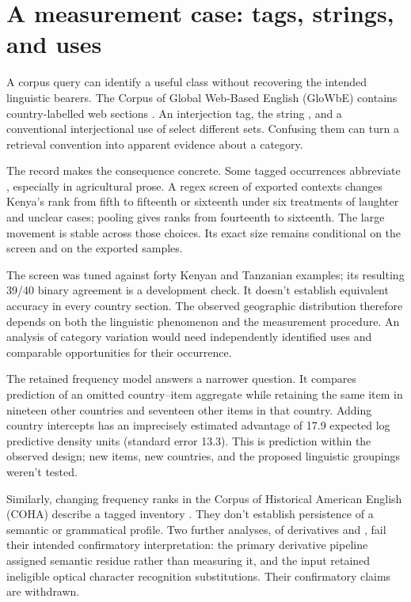 \section{A measurement case: tags, strings, and uses}\label{sec:evidence}

A corpus query can identify a useful class without recovering the intended
linguistic bearers. The Corpus of Global Web-Based English (GloWbE)
contains country-labelled web sections \citep{daviesfuchs2015}.
An interjection tag, the string , and a conventional
interjectional use of  select different sets. Confusing them
can turn a retrieval convention into apparent evidence about a category.

The  record makes the consequence concrete. Some tagged
occurrences abbreviate , especially in agricultural prose.
A regex screen of exported contexts changes Kenya's rank from fifth
to fifteenth or sixteenth under six treatments of laughter and unclear
cases; pooling gives ranks from fourteenth to sixteenth. The large
movement is stable across those choices. Its exact size remains
conditional on the screen and on the exported samples.

The screen was tuned against forty Kenyan and Tanzanian examples;
its resulting 39/40 binary agreement is a development check. It doesn't
establish equivalent accuracy in every country section. The observed
geographic distribution therefore depends on both the linguistic
phenomenon and the measurement procedure. An analysis of category
variation would need independently identified uses and comparable
opportunities for their occurrence.

The retained frequency model answers a narrower question. It compares
prediction of an omitted country--item aggregate while retaining the
same item in nineteen other countries and seventeen other items in
that country. Adding country intercepts has an imprecisely estimated
advantage of 17.9 expected log predictive density units (standard error
13.3). This is prediction within the observed design; new items,
new countries, and the proposed linguistic groupings weren't tested.

Similarly, changing frequency ranks in the Corpus of Historical American
English (COHA) describe a tagged inventory \citep{davies2010}.
They don't establish persistence of a semantic or grammatical profile.
Two further analyses, of derivatives and , fail their
intended confirmatory interpretation: the primary derivative pipeline
assigned semantic residue rather than measuring it, and the 
input retained ineligible optical character recognition substitutions.
Their confirmatory claims are withdrawn.

